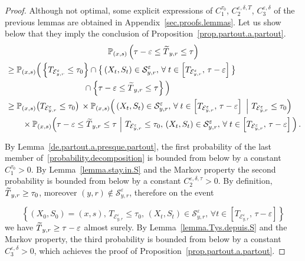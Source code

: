\documentclass[10pt]{amsart}
\theoremstyle{definition}\newtheorem{defi}[theo]{Definition}\newtheorem{rema}[theo]{Remark}\newtheorem{exam}[theo]{Example}\newtheorem{exem}[theo]{Example}\newtheorem{nota}[theo]{Notation}
\newcommand{\PP}{\mathbb{P}}
\newcommand{\clE}{\mathcal{E}}
\newcommand{\clS}{\mathcal{S}}
\newcommand{\1}{\mathbf{1}}
\let\oldtilde\tilde
\renewcommand*{\tilde}[1]{\mathchoice{\widetilde{#1}}{\widetilde{#1}}{\oldtilde{#1}}{\oldtilde{#1}}}
\let\oldforall\forall
\renewcommand*{\forall}{\mathrel{\oldforall}}
\begin{document}
\begin{proof}
Although not optimal, some explicit expressions of $C_1^{\tau_0}$, $C^{\varepsilon,\delta,T}_2$, $C^{\varepsilon,\delta}_3$ of the previous lemmas are obtained in Appendix~\ref{sec.proofs.lemmas}. Let us show below that they imply the conclusion of Proposition~\ref{prop.partout.a.partout}.
\begin{multline}\label{probability.decomposition}
 \PP_{(x,s)}\left(\tau-\varepsilon \leq \tilde T_{y,r} \leq \tau\right)
\\
\begin{aligned}
& \geq \PP_{(x,s)}\Big(\left\{T_{\clE_{y,r}^\varepsilon}\leq \tau_0\right\}
\cap \big\{\left(X_t,S_t\right) \in \clS_{y,r}^\varepsilon, \,
\forall t\in\left[T_{\clE_{y,r}^\varepsilon}, \, \tau-\varepsilon\right]\big\}\\
&\mkern170mu
\cap \left\{\tau-\varepsilon \leq \tilde T_{y,r} \leq \tau\right\}\Big)
\\
&\geq \PP_{(x,s)}\big(T_{\clE_{y,r}^\varepsilon}\leq \tau_0\big)\,
\times
\PP_{(x,s)}
\Big(\left(X_t,S_t\right) \in \clS_{y,r}^\varepsilon, \,
\forall t\in\left[T_{\clE_{y,r}^\varepsilon}, \, \tau-\varepsilon\right] \ \Big| \ T_{\clE_{y,r}^\varepsilon}\leq \tau_0 \Big)
\\
&\qquad
\times \PP_{(x,s)}
\Big(\tau-\varepsilon \leq \tilde T_{y,r} \leq \tau \ \Big| \ T_{\clE_{y,r}^\varepsilon}\leq \tau_0, \, \left(X_t,S_t\right) \in \clS_{y,r}^\varepsilon, \,
\forall t\in\left[T_{\clE_{y,r}^\varepsilon}, \, \tau-\varepsilon\right] \Big)\,.
\end{aligned}
\end{multline}

By Lemma~\ref{de.partout.a.presque.partout}, the first probability of the last member of~\eqref{probability.decomposition} is bounded from below by a constant $C_1^{\tau_0}>0$. By Lemma~\ref{lemma.stay.in.S} and the Markov property the second probability is bounded from below by a constant $C^{\varepsilon,\delta,\tau}_2>0$. By definition, $\tilde T_{y,r} \geq \tau_0$, moreover $(y,r) \notin \clS_{y,r}^\varepsilon$, therefore on the event

\[
\left\{\left(X_0,S_0\right)=(x,s), \, T_{\clE_{y,r}^\varepsilon}\leq \tau_0, \, \left(X_t,S_t\right) \in \clS_{y,r}^\varepsilon, \, \forall t\in\left[T_{\clE_{y,r}^\varepsilon}, \, \tau-\varepsilon\right]\right\}
\]
we have $\tilde T_{y,r}\geq \tau-\varepsilon$ almost surely. By Lemma~\ref{lemma.Tys.depuis.S} and the Markov property, the third probability is bounded from below by a constant $C^{\varepsilon,\delta}_3>0$, which achieves the proof of Proposition~\ref{prop.partout.a.partout}.
\end{proof}
\end{document}
